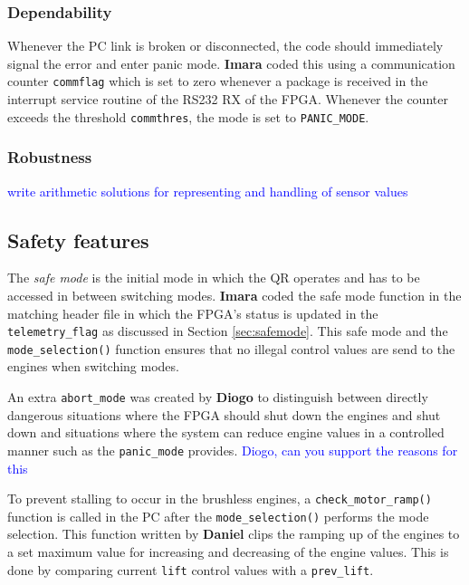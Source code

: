 \documentclass{article}
\newcommand\todo[1]{\textcolor{blue}{#1}} %
\begin{document}
\subsubsection{Dependability}
Whenever the PC link is broken or disconnected, the code should immediately signal the error and enter panic mode. \textbf{Imara} coded this using a communication counter \texttt{commflag} which is set to zero whenever a package is received in the interrupt service routine of the RS232 RX of the FPGA. Whenever the counter exceeds the threshold \texttt{commthres}, the mode is set to \texttt{PANIC\_MODE}. 

\subsubsection{Robustness}
\todo{write arithmetic solutions for representing and handling of sensor values}


\subsection{Safety features}
The \emph{safe mode} is the initial mode in which the QR operates and has to be accessed in between switching modes. \textbf{Imara} coded the safe mode function in the matching header file in which the FPGA's status is updated in the \texttt{telemetry\_flag} as discussed in Section \ref{sec:safemode}. This safe mode and the \texttt{mode\_selection()} function ensures that no illegal control values are send to the engines when switching modes. 

An extra \texttt{abort\_mode} was created by \textbf{Diogo} to distinguish between directly dangerous situations where the FPGA should shut down the engines and shut down and situations where the system can reduce engine values in a controlled manner such as the \texttt{panic\_mode} provides. \todo{Diogo, can you support the reasons for this}

To prevent stalling to occur in the brushless engines, a \texttt{check\_motor\_ramp()} function is called in the PC after the \texttt{mode\_selection()} performs the mode selection. This function written by \textbf{Daniel} clips the ramping up of the engines to a set maximum value for increasing and decreasing of the engine values. This is done by comparing current \texttt{lift} control values with a \texttt{prev\_lift}. 
\end{document}
